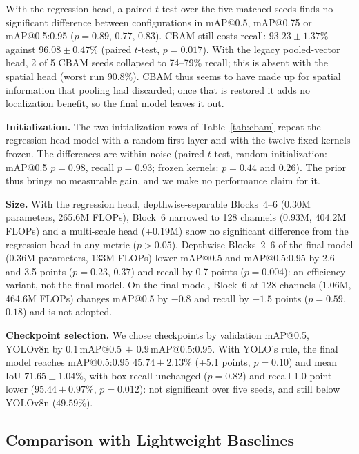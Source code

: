 \documentclass[pdflatex,sn-mathphys-num,iicol]{sn-jnl}%
\begin{document}
 With the regression head, a paired $t$-test over the five matched seeds
finds no significant difference between configurations in mAP@0.5, mAP@0.75
or mAP@0.5:0.95 ($p=0.89$, $0.77$, $0.83$). CBAM still costs recall:
$93.23\pm1.37\%$ against $96.08\pm0.47\%$ (paired $t$-test, $p=0.017$). With
the legacy pooled-vector head, 2 of 5 CBAM seeds collapsed to 74--79\%
recall; this is absent with the spatial head (worst run 90.8\%). CBAM thus seems
to have made up for spatial information that pooling had discarded; once that is
restored it adds no localization benefit, so the final model leaves it out.

 \textbf{Initialization.} The two initialization rows of Table~\ref{tab:cbam}
repeat the regression-head model with a random first layer and with the twelve fixed kernels
frozen. The differences are within noise (paired
$t$-test, random initialization: mAP@0.5 $p=0.98$, recall $p=0.93$; frozen
kernels: $p=0.44$ and $0.26$). The prior thus brings no measurable gain, and we
make no performance claim for it.

 \textbf{Size.} With the regression head, depthwise-separable Blocks~4--6 (0.30M parameters, 265.6M FLOPs),
Block~6 narrowed to 128 channels (0.93M, 404.2M FLOPs) and a multi-scale head
(+0.19M) show no significant difference from the regression head in any metric ($p>0.05$). Depthwise
Blocks~2--6 of the final model (0.36M parameters, 133M FLOPs) lower mAP@0.5 and
mAP@0.5:0.95 by 2.6 and 3.5 points ($p=0.23$, $0.37$) and recall by 0.7 points
($p=0.004$): an efficiency variant, not the final model. On the final model, Block~6 at 128 channels (1.06M, 464.6M FLOPs) changes mAP@0.5 by $-0.8$ and recall by $-1.5$ points ($p=0.59$, $0.18$) and is not adopted.

 \textbf{Checkpoint selection.} We chose checkpoints by validation mAP@0.5, YOLOv8n by
$0.1\,$mAP@0.5$\,+\,0.9\,$mAP@0.5:0.95. With
YOLO's rule, the final model reaches mAP@0.5:0.95 $45.74\pm2.13\%$ (+5.1 points,
$p=0.10$) and mean IoU $71.65\pm1.04\%$, with box recall unchanged ($p=0.82$) and recall
1.0 point lower ($95.44\pm0.97\%$, $p=0.012$): not significant over five seeds, and
still below YOLOv8n ($49.59\%$).

\subsection{Comparison with Lightweight Baselines}\label{sec:baselines}
\end{document}
